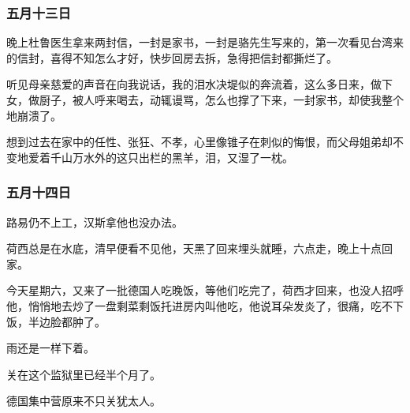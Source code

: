 \subsubsection{五月十三日}
\par 晚上杜鲁医生拿来两封信，一封是家书，一封是骆先生写来的，第一次看见台湾来的信封，喜得不知怎么才好，快步回房去拆，急得把信封都撕烂了。
\par 听见母亲慈爱的声音在向我说话，我的泪水决堤似的奔流着，这么多日来，做下女，做厨子，被人呼来喝去，动辄谩骂，怎么也撑了下来，一封家书，却使我整个地崩溃了。
\par 想到过去在家中的任性、张狂、不孝，心里像锥子在刺似的悔恨，而父母姐弟却不变地爱着千山万水外的这只出栏的黑羊，泪，又湿了一枕。

\subsubsection{五月十四日}
\par 路易仍不上工，汉斯拿他也没办法。
\par 荷西总是在水底，清早便看不见他，天黑了回来埋头就睡，六点走，晚上十点回家。
\par 今天星期六，又来了一批德国人吃晚饭，等他们吃完了，荷西才回来，也没人招呼他，悄悄地去炒了一盘剩菜剩饭托进房内叫他吃，他说耳朵发炎了，很痛，吃不下饭，半边脸都肿了。
\par 雨还是一样下着。
\par 关在这个监狱里已经半个月了。
\par 德国集中营原来不只关犹太人。

